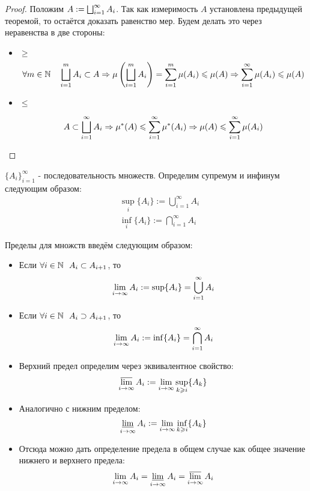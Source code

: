 \begin{proof}
	Положим $A := \bigsqcup_{i = 1}^\infty A_i$. Так как измеримость $A$ установлена предыдущей теоремой, то остаётся доказать равенство мер. Будем делать это через неравенства в две стороны:
	\begin{itemize}
		\item $\ge$
		\[
			\forall m \in \mathbb{N} \quad \bigsqcup_{i = 1}^m A_i \subset A \Rightarrow \mu\left(\bigsqcup_{i = 1}^m A_i\right) = \sum_{i = 1}^m \mu(A_i) \leqslant \mu(A) \Rightarrow \sum_{i = 1}^\infty \mu(A_i) \leqslant \mu(A)
		\]
		
		\item $\le$
		
		\[
			A \subset \bigsqcup_{i = 1}^\infty A_i \Rightarrow \mu^*(A) \leqslant \sum_{i = 1}^\infty \mu^*(A_i) \Rightarrow \mu(A) \leqslant \sum_{i = 1}^\infty \mu(A_i)
		\]
	\end{itemize}
\end{proof}

\begin{definition}
	$\{A_i\}_{i = 1}^\infty$ - последовательность множеств. Определим супремум и инфинум следующим образом:
	\begin{align*}
		&{\sup_i \{A_i\} := \bigcup_{i = 1}^\infty A_i}
		\\
		&{\inf_i \{A_i\} := \bigcap_{i = 1}^\infty A_i}
	\end{align*}
\end{definition}

\begin{definition}
	Пределы для множств введём следующим образом:
	\begin{itemize}
		\item Если $\forall i \in \mathbb{N}\ \ A_i \subset A_{i + 1}$, то
		\[
			\lim\limits_{i \to \infty} A_i := \sup \{A_i\} = \bigcup_{i = 1}^\infty A_i
		\]
		
		\item Если $\forall i \in \mathbb{N}\ \ A_i \supset A_{i + 1}$, то
		\[
			\lim\limits_{i \to \infty} A_i := \inf \{A_i\} = \bigcap_{i = 1}^\infty A_i
		\]
		
		\item Верхний предел определим через эквивалентное свойство:
		\[
			\varlimsup_{i \to \infty} A_i := \lim\limits_{i \to \infty} \sup_{k \geqslant i} \{A_k\}
		\]
		
		\item Аналогично с нижним пределом:
		\[
			\varliminf_{i \to \infty} A_i := \lim\limits_{i \to \infty} \inf_{k \geqslant i} \{A_k\}
		\]
		
		\item Отсюда можно дать определение предела в общем случае как общее значение нижнего и верхнего предела:
		\[
			\lim\limits_{i \to \infty} A_i = \varliminf_{i \to \infty} A_i = \varlimsup_{i \to \infty} A_i
		\]
	\end{itemize}
\end{definition}

